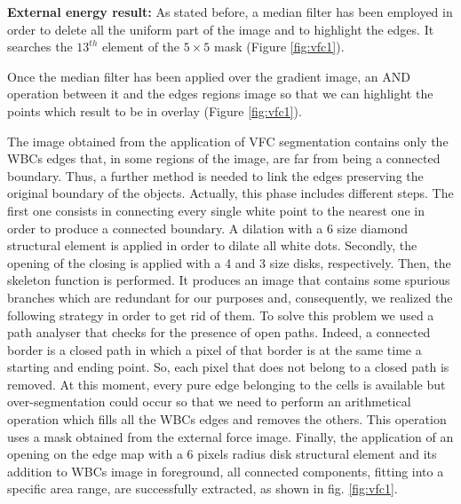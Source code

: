 \documentclass[final,a4paper,12pt,english]{UnicaPhdThesis3}
\begin{document}
\textbf{External energy result:}  As stated before, a median filter has been employed in order to delete all the uniform part of the image and to highlight the edges. It searches the $13^{th}$ element of the $5 \times 5$ mask (Figure \ref{fig:vfc1}). 

Once the median filter has been applied over the gradient image, an AND operation between it and the edges regions image so that we can highlight the points which result to be in overlay (Figure \ref{fig:vfc1}).

The image obtained from the application of VFC segmentation contains only the WBCs edges that, in some regions of the image, are far from being a connected boundary. Thus, a further method is needed to link the edges preserving the original boundary of the objects. Actually, this phase includes different steps. The first one consists in connecting every single white point to the nearest one in order to produce a connected boundary. A dilation with a 6 size diamond structural element is applied in order to dilate all white dots. Secondly, the opening of the closing is applied with a 4 and 3 size disks, respectively. Then, the skeleton function is performed. It produces an image that contains some spurious branches which are redundant for our purposes and, consequently, we realized the following strategy in order to get rid of them. 
To solve this problem we used a path analyser that checks for the presence of open paths. Indeed, a connected border is a closed path in which a pixel of that border is at the same time a starting and ending point. So, each pixel that does not belong to a closed path is removed.
At this moment, every pure edge belonging to the cells is available but over-segmentation could occur so that we need to perform an arithmetical operation which fills all the WBCs edges and removes the others. This operation uses a mask obtained from the external force image.
Finally, the application of an opening on the edge map with a 6 pixels radius disk structural element and its addition to WBCs image in foreground, all connected components, fitting into a specific area range, are successfully extracted, as shown in fig. \ref{fig:vfc1}. 
\end{document}
